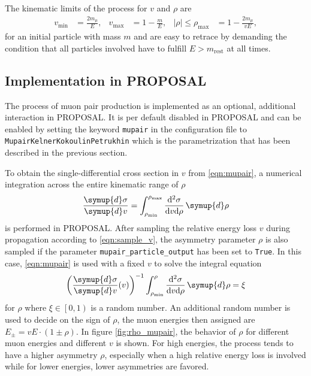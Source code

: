 The kinematic limits of the process for $v$ and $\rho$ are
%
\begin{align}
    v_\text{min} &= \frac{2 m_{\mu}}{E}, & v_\text{max} &= 1 - \frac{m}{E}, & \left| \rho \right| \leq \rho_{\text{max}} &= 1 - \frac{2 m_{\mu}}{v E},
\end{align}
%
for an initial particle with mass $m$ and are easy to retrace by demanding the condition that all particles involved have to fulfill $E > m_{\text{rest}}$ at all times.

\subsection{Implementation in PROPOSAL}
\label{sec:mupair_implementation}

\begin{sloppypar}
The process of muon pair production is implemented as an optional, additional interaction in PROPOSAL.
It is per default disabled in PROPOSAL and can be enabled by setting the keyword \texttt{mupair} in the configuration file to \texttt{MupairKelnerKokoulinPetrukhin} which is the parametrization that has been described in the previous section.
\end{sloppypar}

\begin{sloppypar}
To obtain the single-differential cross section in $v$ from \eqref{eqn:mupair}, a numerical integration across the entire kinematic range of $\rho$
%
\begin{equation}
    \frac{\symup{d}\sigma}{\symup{d}v} = \int_{\rho_{\text{min}}}^{\rho_{\text{max}}} \frac{\mathrm{d}^2\sigma}{\mathrm{d}v \mathrm{d}\rho} \, \symup{d}\rho
\end{equation}
%
is performed in PROPOSAL.
After sampling the relative energy loss $v$ during propagation according to \eqref{eqn:sample_v}, the asymmetry parameter $\rho$ is also sampled if the parameter \texttt{mupair\_particle\_output} has been set to \texttt{True}.
In this case, \eqref{eqn:mupair} is used with a fixed $v$ to solve the integral equation
\begin{equation}
    \left( \frac{\symup{d}\sigma}{\symup{d}v}(v) \right)^{-1} \int_{\rho_\text{min}}^{\rho} \frac{\mathrm{d}^2\sigma}{\mathrm{d}v \mathrm{d}\rho} \, \symup{d}\rho = \xi
\end{equation}
for $\rho$ where $\xi \in \left[0,1\right)$ is a random number.
An additional random number is used to decide on the sign of $\rho$, the muon energies then assigned are $E_{\pm} = v E \cdot(1 \pm \rho)$.
In figure \ref{fig:rho_mupair}, the behavior of $\rho$ for different muon energies and different $v$ is shown.
For high energies, the process tends to have a higher asymmetry $\rho$, especially when a high relative energy loss is involved while for lower energies, lower asymmetries are favored.
\end{sloppypar}

